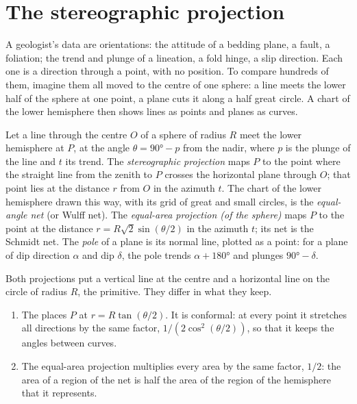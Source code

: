 \section{The stereographic projection}\label{sec:b3:structural-analysis:stereo}

A geologist's data are orientations: the attitude of a bedding plane, a
fault, a foliation; the trend and plunge of a lineation, a fold hinge, a slip
direction. Each one is a direction through a point, with no position. To
compare hundreds of them, imagine them all moved to the centre of one sphere:
a line meets the lower half of the sphere at one point, a plane cuts it along
a half great circle. A chart of the lower hemisphere then shows lines as
points and planes as curves.

\begin{definition}\label{def:b3:structural-analysis:stereo}
Let a line through the centre $O$ of a sphere of radius $R$ meet the lower
hemisphere at $P$, at the angle $\theta = \ang{90} - p$ from the nadir, where
$p$ is the plunge of the line and $t$ its trend. The \emph{stereographic
projection} maps $P$ to the point where the
straight line from the zenith to $P$ crosses the horizontal plane through
$O$; that point lies at the distance $r$ from $O$ in the azimuth $t$. The
chart of the lower hemisphere drawn this way, with its grid of great and
small circles, is the \emph{equal-angle net} (or
Wulff net). The \emph{equal-area projection (of the sphere)}
maps $P$ to the point at the distance $r =
R\sqrt2\sin(\theta/2)$ in the azimuth $t$; its net is the Schmidt net. The
\emph{pole} of a plane is its normal line, plotted as
a point: for a plane of dip direction $\alpha$ and dip $\delta$, the pole
trends $\alpha + \ang{180}$ and plunges $\ang{90} - \delta$.
\end{definition}

Both projections put a vertical line at the centre and a horizontal line on
the circle of radius $R$, the primitive. They differ in what they keep.

\begin{theorem}\label{thm:b3:structural-analysis:projections}
\begin{enumerate}[label=(\alph*)]
  \item The  places $P$ at $r = R\tan(\theta/2)$. It
        is conformal: at every point it stretches all directions by the same
        factor, $1/(2\cos^2(\theta/2))$, so that it keeps the angles between
        curves.
  \item The equal-area projection multiplies every area by the same factor,
        $1/2$: the area of a region of the net is half the area of the region
        of the hemisphere that it represents.
\end{enumerate}
\end{theorem}

